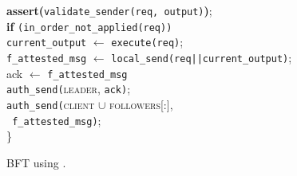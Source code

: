 \begin{algorithm}
    {\bf assert(}\texttt{validate\_sender(req, output)}{\bf)};\\
    {\bf if }{\tt (in\_order\_not\_applied(req))}\\
    \Indp
    {\tt current\_output} $\leftarrow$ \texttt{execute(req)};\\
    {\tt f\_attested\_msg} $\leftarrow$ \texttt{local\_send(req||current\_output)};\\
    ack $\leftarrow$ {\tt f\_attested\_msg}\\
    \texttt{auth\_send(}\textsc{leader}, {\tt ack)};\\    
    \texttt{auth\_send(}\textsc{client} $\cup$ \textsc{followers[:]},\\{\tt\hspace{40pt} f\_attested\_msg)};\\    
    \Indm
    \Indm
\Indm
\} \\
\vspace{-1pt}
\caption{BFT using \projecttitle{}.}
\label{algo:tnic_bft}
\end{algorithm}

%



